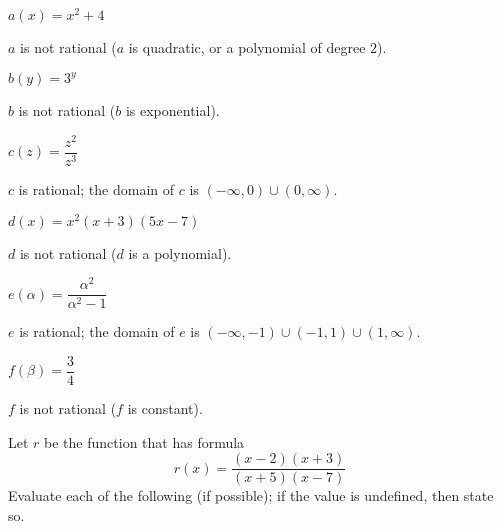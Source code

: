 \begin{exercises}
\begin{problem}
\begin{multicols}{3}
\begin{subproblem}
			 $a(x)=x^2+4$
			 \begin{shortsolution}
				 $a$ is not rational ($a$ is quadratic, or a polynomial of degree $2$).
			 \end{shortsolution}
		 \end{subproblem}
		 \begin{subproblem}
			 $b(y)=3^y$
			 \begin{shortsolution}
				 $b$ is not rational ($b$ is exponential).
			 \end{shortsolution}
		 \end{subproblem}
		 \begin{subproblem}
			 $c(z)=\dfrac{z^2}{z^3}$
			 \begin{shortsolution}
				 $c$ is rational; the domain of $c$ is $(-\infty,0)\cup (0,\infty)$.
			 \end{shortsolution}
		 \end{subproblem}
		 \begin{subproblem}
			 $d(x)=x^2(x+3)(5x-7)$
			 \begin{shortsolution}
				 $d$ is not rational ($d$ is a polynomial).
			 \end{shortsolution}
		 \end{subproblem}
		 \begin{subproblem}
			 $e(\alpha)=\dfrac{\alpha^2}{\alpha^2-1}$
			 \begin{shortsolution}
				 $e$ is rational; the domain of $e$ is $(-\infty,-1)\cup(-1,1)\cup(1,\infty)$.
			 \end{shortsolution}
		 \end{subproblem}
		 \begin{subproblem}
			 $f(\beta)=\dfrac{3}{4}$
			 \begin{shortsolution}
				 $f$ is not rational ($f$ is constant).
			 \end{shortsolution}
		 \end{subproblem}
	 \end{multicols}
	 \end{problem}
	 \begin{problem}
	 Let $r$ be the function that has formula
	 \[
		 r(x)=\frac{(x-2)(x+3)}{(x+5)(x-7)}
	 \]
	 Evaluate each of the following (if possible); if the value is undefined,
	 then state so.
	 \begin{multicols}{4}
		 \begin{subproblem}

\end{subproblem}
\end{multicols}
\end{problem}
\end{exercises}
